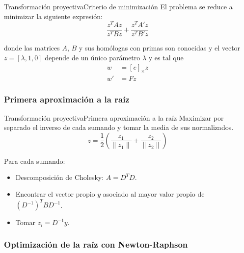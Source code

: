 \documentclass[aspectratio=169,14pt,spanish]{beamer}
\begin{document}
      \begin{frame}{Transformación proyectiva}{Criterio de minimización}
          El problema se reduce a minimizar la siguiente expresión:
          \begin{equation}
              \frac{z^TAz}{z^TBz} + \frac{z^TA'z}{z^TB'z}
              \label{eq_minz}
          \end{equation}

          donde las matrices $A$, $B$ y sus homólogas con primas son conocidas y el vector $z = [\lambda, 1, 0]$ depende de un único parámetro $\lambda$ y es tal que
          \begin{align*}
            w &= [e]_\times z\\
            w' &= Fz
          \end{align*}
      \end{frame}

      \subsubsection{Primera aproximación a la raíz}

        \begin{frame}{Transformación proyectiva}{Primera aproximación a la raíz}
            Maximizar por separado el inverso de cada sumando y tomar la media de sus normalizados.
            \[
            z = \frac{1}{2}\left(\frac{z_1}{\lVert z_1 \rVert} + \frac{z_2}{\lVert z_2 \rVert}\right)
            \]

            Para cada sumando:
            \begin{itemize}
                \item<2-> Descomposición de Cholesky: $A = D^TD$.
                \item<3-> Encontrar el vector propio $y$ asociado al mayor valor propio de $(D^{-1})^T B D^{-1}$.
                \item<4-> Tomar $z_i = D^{-1}y$.
            \end{itemize}
        \end{frame}
      \subsubsection{Optimización de la raíz con Newton-Raphson}
\end{document}
